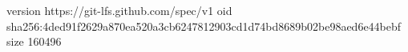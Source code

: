 version https://git-lfs.github.com/spec/v1
oid sha256:4ded91f2629a870ea520a3cb6247812903cd1d74bd8689b02be98aed6e44bebf
size 160496
